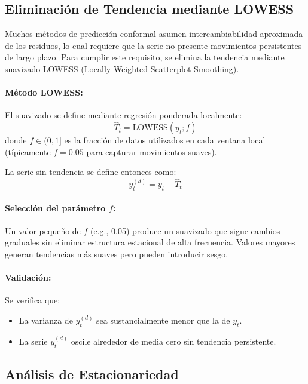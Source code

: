 \subsection{Eliminación de Tendencia mediante LOWESS}
\label{subsec:eda_detrending}

Muchos métodos de predicción conformal asumen intercambiabilidad aproximada de los residuos, lo cual requiere que la serie no presente movimientos persistentes de largo plazo. Para cumplir este requisito, se elimina la tendencia mediante suavizado LOWESS (Locally Weighted Scatterplot Smoothing).

\paragraph{Método LOWESS:} El suavizado se define mediante regresión ponderada localmente:
\begin{equation}
\hat{T}_t = \text{LOWESS}(y_t; f)
\label{eq:lowess}
\end{equation}
donde $f \in (0,1]$ es la fracción de datos utilizados en cada ventana local (típicamente $f = 0.05$ para capturar movimientos suaves).

La serie sin tendencia se define entonces como:
\begin{equation}
y_t^{(d)} = y_t - \hat{T}_t
\label{eq:detrended}
\end{equation}

\paragraph{\texorpdfstring{Selección del parámetro $f$:}{Selección del parámetro f:}} Un valor pequeño de $f$ (e.g., 0.05) produce un suavizado que sigue cambios graduales sin eliminar estructura estacional de alta frecuencia. Valores mayores generan tendencias más suaves pero pueden introducir sesgo.

\paragraph{Validación:} Se verifica que:
\begin{itemize}
\item La varianza de $y_t^{(d)}$ sea sustancialmente menor que la de $y_t$.
\item La serie $y_t^{(d)}$ oscile alrededor de media cero sin tendencia persistente.
\end{itemize}

\subsection{Análisis de Estacionariedad}
\label{subsec:eda_estacionariedad_analisis}

